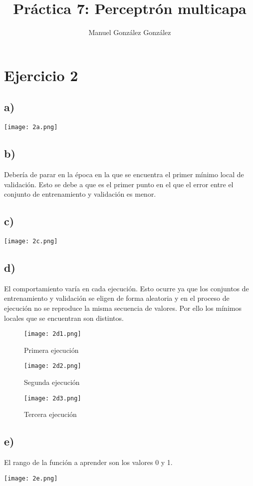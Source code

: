 \documentclass[12pt]{article}
\author{Manuel González González}
\title{Práctica 7: Perceptrón multicapa}
\begin{document}
\maketitle

\section*{Ejercicio 2}
\subsection*{a)}
\texttt{[image: 2a.png]}

\subsection*{b)}
Debería de parar en la época en la que se encuentra el primer mínimo local de validación. Esto se debe a que es el primer punto en el que el error entre el conjunto de entrenamiento y validación es menor.

\subsection*{c)}
\texttt{[image: 2c.png]}

\subsection*{d)}
El comportamiento varía en cada ejecución. Esto ocurre ya que los conjuntos de entrenamiento y validación se eligen de forma aleatoria y en el proceso de ejecución no se reproduce la misma secuencia de valores. Por ello los mínimos locales que se encuentran son distintos.

\begin{figure}
\texttt{[image: 2d1.png]}
\caption{Primera ejecución}
\end{figure}
\begin{figure}
\texttt{[image: 2d2.png]}
\caption{Segunda ejecución}
\end{figure}
\begin{figure}
\texttt{[image: 2d3.png]}
\caption{Tercera ejecución}
\end{figure}


\subsection*{e)}
El rango de la función a aprender son los valores 0 y 1.

\texttt{[image: 2e.png]}
\end{document}
